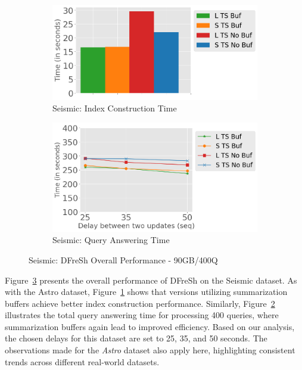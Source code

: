\begin{figure}
	\centering
	\begin{subfigure}[c]{0.48\textwidth}
		\includegraphics[width=1\textwidth]   {figures/Experiments/Dynamic/SEISMIC/index_construction_seismic.png}
		\caption{Seismic: Index Construction Time }
		\label{fig:actual-index-Construction-time-seismic}
	\end{subfigure}
	\begin{subfigure}[c]{0.48\textwidth}
		\includegraphics[width=1\textwidth]	 {figures/Experiments/Dynamic/SEISMIC/query_answering_xaxis.png}
		\caption{Seismic: Query Answering Time}
		\label{fig:actual-query-answering-time-seismic}
	\end{subfigure}
	\caption{Seismic: DFreSh Overall Performance - 90GB/400Q}
	\label{fig:dfresh-performance-seismic}
\end{figure}

Figure~\ref{fig:dfresh-performance-seismic} presents the overall performance of DFreSh
on the Seismic dataset. As with the Astro dataset, 
Figure~\ref{fig:actual-index-Construction-time-seismic} shows that versions utilizing 
summarization buffers achieve better index construction performance. Similarly, 
Figure~\ref{fig:actual-query-answering-time-seismic} illustrates the total query
answering time for processing 400 queries, where summarization buffers again lead to
improved efficiency. Based on our analysis, the chosen delays for this dataset are set
to 25, 35, and 50 seconds. The observations made for the \textit{Astro} dataset also 
apply here, highlighting consistent trends across different real-world datasets.

